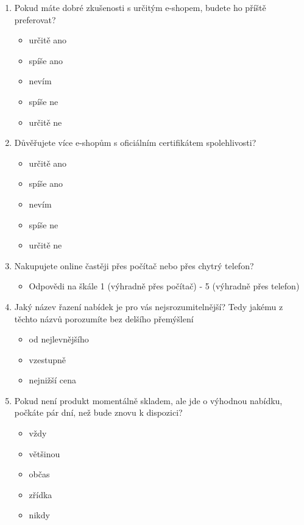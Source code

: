 \documentclass[12pt,twoside,openany]{fithesis}
\begin{document}
\begin{enumerate}
  \item Pokud máte dobré zkušenosti s určitým e-shopem, budete ho příště preferovat?
    \begin{itemize}
       \item určitě ano
       \item spíše ano
       \item nevím
       \item spíše ne
       \item určitě ne
    \end{itemize}

  \item Důvěřujete více e-shopům s oficiálním certifikátem spolehlivosti?
    \begin{itemize}
       \item určitě ano
       \item spíše ano
       \item nevím
       \item spíše ne
       \item určitě ne
    \end{itemize}

  \item Nakupujete online častěji přes počítač nebo přes chytrý telefon?
    \begin{itemize}
        \item Odpovědi na škále 1 (výhradně přes počítač) - 5 (výhradně přes telefon)
    \end{itemize}

  \item Jaký název řazení nabídek je pro vás nejsrozumitelnější? Tedy jakému z těchto názvů porozumíte bez delšího přemýšlení
    \begin{itemize}
       \item od nejlevnějšího
       \item vzestupně
       \item nejnižší cena
    \end{itemize}

  \item Pokud není produkt momentálně skladem, ale jde o výhodnou nabídku, počkáte pár dní, než bude znovu k dispozici?
    \begin{itemize}
       \item vždy
       \item většinou
       \item občas
       \item zřídka
       \item nikdy
    \end{itemize}


\end{enumerate}
\end{document}
